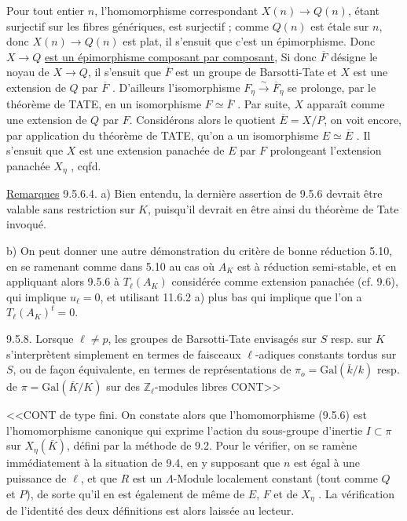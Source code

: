 
Pour tout entier $n$, l'homomorphisme correspondant $X(n) \longrightarrow Q(n)$, étant surjectif sur les fibres génériques, est surjectif ; comme $Q(n)$ est étale sur $n$, donc $X(n) \longrightarrow Q(n)$ est plat, il s'ensuit que c'est un épimorphisme. Donc $X \longrightarrow Q$ \underline{est un épimorphisme composant par composant}, Si donc $\overline{F}$ désigne le noyau de $X \longrightarrow Q$, il s'ensuit que $\overline{F}$ est un groupe de Barsotti-Tate et $X$ est une extension de $Q$ par $\overline{F}$ . D'ailleurs l'isomorphisme $F_\eta \xrightarrow{\sim} \overline{F}_\eta$ se prolonge, par le théorème de TATE, en un isomorphisme $F \simeq \overline{F}$ . Par suite, $X$ apparaît comme une extension de $Q$ par $F$. Considérons alors le quotient $\overline{E} = X/P$, on voit encore, par application du théorème de TATE, qu'on a un isomorphisme $E \simeq \overline{E}$ . Il s'ensuit que $X$ est une extension panachée de $E$ par $F$ prolongeant l'extension panachée $X_\eta$ , cqfd.

\underline{Remarques} 9.5.6.4.  a)  Bien entendu, la dernière assertion de 9.5.6 devrait être valable sans restriction sur $K$, puisqu'il devrait en être ainsi du théorème de Tate invoqué.

b)  On peut donner une autre démonstration du critère de bonne réduction 5.10, en se ramenant comme dans 5.10 au cas où $A_K$ est à réduction semi-stable, et en appliquant alors 9.5.6 à $T_\ell(A_K)$ considérée comme extension panachée (cf. 9.6), qui implique $u_\ell = 0$, et utilisant 11.6.2 a) plus bas qui implique que l'on a $T_\ell(A_K)^t = 0$.

9.5.8.  Lorsque $\ell \neq p$, les groupes de Barsotti-Tate envisagés sur $S$ resp. sur $K$ s'interprètent simplement en termes de faisceaux $\ell$-adiques constants tordus sur $S$, ou de façon équivalente, en termes de représentations de $\pi_o = \mathrm{Gal}(\overline{k}/k)$ resp. de $\pi = \mathrm{Gal}(\overline{K}/K)$ sur des $\mathbb{Z}_\ell$-modules libres CONT>>



<<CONT de type fini. On constate alors que l'homomorphisme (9.5.6) est l'homomorphisme canonique qui exprime l'action du sous-groupe d'inertie $I \subset \pi$ sur $X_\eta(\overline{K})$, défini par la méthode de 9.2. Pour le vérifier, on se ramène immédiatement à la situation de 9.4, en y supposant  que $n$ est égal à une puissance de $\ell$, et que $R$ est un $\Lambda$-Module localement constant (tout comme $Q$ et $P$), de sorte qu'il en est également de même de $E$, $F$ et de $X_\eta$ . La vérification de l'identité des deux définitions est alors laissée au lecteur.

